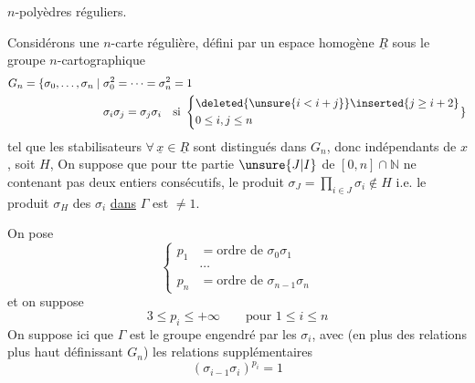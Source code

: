 $n$-polyèdres réguliers.

Considérons  une $n$-carte régulière, défini par un espace homogène $\underline{R}$  sous le groupe $n$-cartographique
\[
\begin{aligned}
G_n=\{\sigma_0,\ldots,\sigma_n\mid {}&\sigma_0^2=\cdots=\sigma_n^2=1\\
&\sigma_i\sigma_j=\sigma_j\sigma_i\quad\text{si }\left\{\begin{aligned}&\deleted{\unsure{i< i+j}}\inserted{j\geq i+2}\\&0\leq i,j\leq n\end{aligned}\right.\}
\end{aligned}
\]
tel que les stabilisateurs  $\forall\,\underline{x}\in\underline{R}$ sont distingués dans $G_n$, donc indépendants de $x$, soit $H$,  On suppose que pour tte partie $\unsure{J|I}$ de $[0,n]\cap\mathbb{N}$ ne contenant pas deux entiers consécutifs, le produit  $\sigma_J=\prod_{i\in J}\sigma_i\notin H$ i.e. le produit $\sigma_H$ des $\sigma_i$ \uline{dans} $\Gamma$ est $\neq1$.

On pose
\[
\left\{\begin{aligned}
p_1&=\text{ordre de }\sigma_0\sigma_1\\
&\cdots\\
p_n&=\text{ordre de }\sigma_{n-1}\sigma_n
\end{aligned}\right.
\]
et on suppose
\[
3\leq p_i\leq+\infty\qquad\text{pour }1\leq i\leq n
\]
On suppose ici que $\Gamma$ est le groupe engendré par les $\sigma_i$, avec (en plus des relations plus haut définissant $G_n$) les relations supplémentaires
\[
(\sigma_{i-1}\sigma_i)^{p_i}=1
\]
